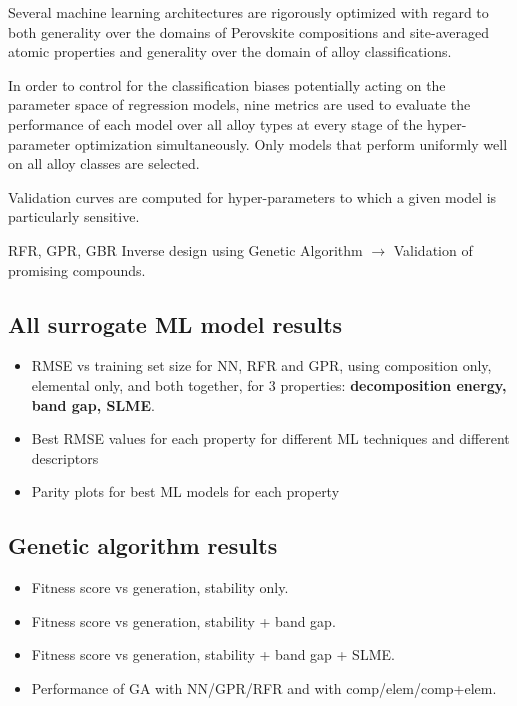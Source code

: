 \documentclass[aip, jmp, amsmath, amssymb]{revtex4-2}
\begin{document}
Several machine learning architectures are rigorously optimized with
regard to both generality over the domains of Perovskite compositions
and site-averaged atomic properties and generality over the domain of
alloy classifications.

In order to control for the classification biases potentially acting
on the parameter space of regression models, nine metrics are used to
evaluate the performance of each model over all alloy types at every
stage of the hyper-parameter optimization simultaneously. Only models
that perform uniformly well on all alloy classes are selected.

Validation curves are computed for hyper-parameters to which a given
model is particularly sensitive.



RFR, GPR, GBR
 Inverse design using Genetic Algorithm \(\rightarrow\)
Validation of promising compounds.\\


\subsection*{All surrogate ML model results}
\label{sec:org8534dc0}

\begin{itemize}
\item RMSE vs training set size for NN, RFR and GPR, using composition only,
elemental only, and both together, for 3 properties: \textbf{decomposition
energy, band gap, SLME}.

\item Best RMSE values for each property for different ML techniques and
different descriptors

\item Parity plots for best ML models for each property
\end{itemize}

\subsection*{Genetic algorithm results}
\label{sec:orgaa3f4d7}

\begin{itemize}
\item Fitness score vs generation, stability only.

\item Fitness score vs generation, stability + band gap.

\item Fitness score vs generation, stability + band gap + SLME.

\item Performance of GA with NN/GPR/RFR and with comp/elem/comp+elem.\\
\end{itemize}
\end{document}
